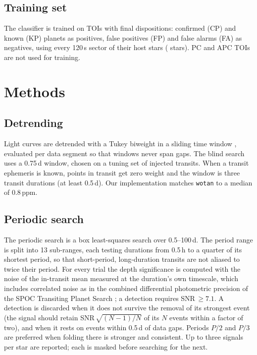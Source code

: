\documentclass{aastex701}
\begin{document}
\subsection{Training set}
The classifier is trained on TOIs with final dispositions: confirmed (CP) and known (KP) planets as
positives, false positives (FP) and false alarms (FA) as negatives, using every 120\,s sector of
their host stars (\trainStars{} stars). PC and APC TOIs are not used for training.

\section{Methods}\label{sec:methods}

\subsection{Detrending}
Light curves are detrended with a Tukey biweight in a sliding time window
\citep[the method of \texttt{wotan};][]{Hippke2019}, evaluated per data segment so that windows never
span gaps. The blind search uses a 0.75\,d window, chosen on a tuning set of injected transits. When a
transit ephemeris is known, points in transit get zero weight and the window is three transit
durations (at least 0.5\,d). Our implementation matches \texttt{wotan} to a median of 0.8\,ppm.

\subsection{Periodic search}
The periodic search is a box least-squares search \citep[BLS;][]{Kovacs2002} over 0.5--100\,d. The
period range is split into 13 sub-ranges, each testing durations from 0.5\,h to a quarter of its
shortest period, so that short-period, long-duration transits are not aliased to twice their period.
For every trial the depth significance is computed with the noise of the in-transit mean measured at
the duration's own timescale, which includes correlated noise as in the combined differential
photometric precision of the SPOC Transiting Planet Search \citep{Jenkins2010}; a detection requires
SNR\,$\geq 7.1$. A detection is discarded when it does not survive the removal of its strongest event
(the signal should retain SNR\,$\sqrt{(N-1)/N}$ of its $N$ events within a factor of two), and when
it rests on events within 0.5\,d of data gaps. Periods $P/2$ and $P/3$ are preferred when folding
there is stronger and consistent. Up to three signals per star are reported; each is masked before
searching for the next.
\end{document}
